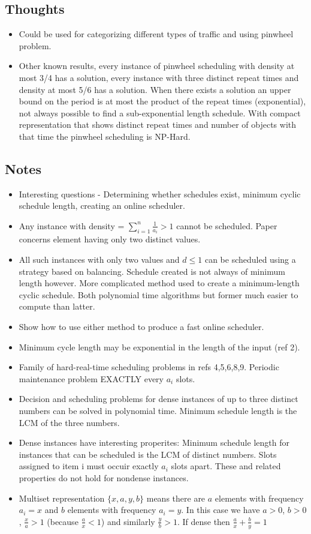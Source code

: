 \documentclass{article}
\begin{document}
\subsection{Thoughts}
\begin{itemize}
    \item Could be used for categorizing different types of traffic and using pinwheel problem.
    \item Other known results, every instance of pinwheel scheduling with density at most 3/4 has a solution, every instance with three distinct repeat times and density at most 5/6 has a solution.  When there exists a solution an upper bound on the period is at most the product of the repeat times (exponential), not always possible to find a sub-exponential length schedule.  With compact representation that shows distinct repeat times and number of objects with that time the pinwheel scheduling is NP-Hard.
\end{itemize}

\subsection{Notes}
\begin{itemize}
    \item Interesting questions - Determining whether schedules exist, minimum cyclic schedule length, creating an online scheduler.
    \item Any instance with density = $\sum_{i=1}^n \frac{1}{a_i} > 1$ cannot be scheduled.  Paper concerns element having only two distinct values.
    \item All such instances with only two values and $d \leq 1$ can be scheduled using a strategy based on balancing.  Schedule created is not always of minimum length however.  More complicated method used to create a minimum-length cyclic schedule.  Both polynomial time algorithms but former much easier to compute than latter.
    \item Show how to use either method to produce a fast online scheduler.
    \item Minimum cycle length may be exponential in the length of the input (ref 2).
    \item Family of hard-real-time scheduling problems in refs 4,5,6,8,9.  Periodic maintenance problem EXACTLY every $a_i$ slots.
    \item Decision and scheduling problems for dense instances of up to three distinct numbers can be solved in polynomial time.  Minimum schedule length is the LCM of the three numbers.
    \item Dense instances have interesting properites: Minimum schedule length for instances that can be scheduled is the LCM of distinct numbers.  Slots assigned to item i must occuir exactly $a_i$ slots apart.  These and related properties do not hold for nondense instances.
    \item Multiset representation $\{x, a, y, b\}$ means there are $a$ elements with frequency $a_i=x$ and $b$ elements with frequency $a_i=y$.  In this case we have $a > 0$, $b > 0$, $\frac{x}{a} > 1$ (because $\frac{a}{x} < 1$) and similarly $\frac{y}{b} > 1$.  If dense then $\frac{a}{x} + \frac{b}{y} = 1$
\end{itemize}
\end{document}
